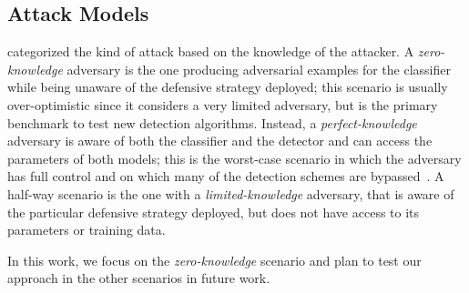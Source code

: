 \subsection{Attack Models}
\label{subsec:attack-model}

\citet{biggio2013evasion} categorized the kind of attack based on the knowledge of the attacker.
A \emph{zero-knowledge} adversary is the one producing adversarial examples for the classifier while being unaware of the defensive strategy deployed;
this scenario is usually over-optimistic since it considers a very limited adversary, but is the primary benchmark to test new detection algorithms.
Instead, a \emph{perfect-knowledge} adversary is aware of both the classifier and the detector and can access the parameters of both models;
this is the worst-case scenario in which the adversary has full control and on which many of the detection schemes are bypassed~\cite{carlini2017adversarial}.
A half-way scenario is the one with a \emph{limited-knowledge} adversary, that is aware of the particular defensive strategy deployed, but does not have access to its parameters or training data.

In this work, we focus on the \emph{zero-knowledge} scenario and plan to test our approach in the other scenarios in future work.



%
%

